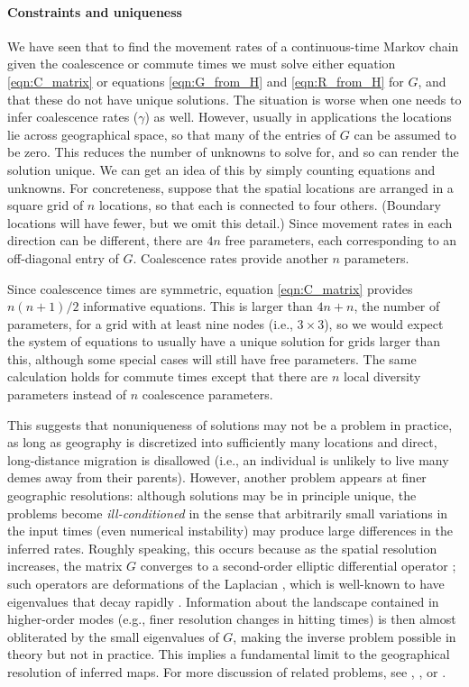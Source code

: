 \documentclass{article}
\begin{document}
\paragraph{Constraints and uniqueness}
We have seen that to find the movement rates of a continuous-time Markov chain
given the coalescence or commute times
we must solve either equation \eqref{eqn:C_matrix} 
or equations \eqref{eqn:G_from_H} and \eqref{eqn:R_from_H} for $G$,
and that these do not have unique solutions.
The situation is worse when one needs to infer coalescence rates ($\gamma$) as well.
However, usually in applications the locations lie across geographical space,
so that many of the entries of $G$ can be assumed to be zero.
This reduces the number of unknowns to solve for,
and so can render the solution unique.
We can get an idea of this by simply counting equations and unknowns.
For concreteness, suppose that the spatial locations
are arranged in a square grid of $n$ locations,
so that each is connected to four others.
(Boundary locations will have fewer, but we omit this detail.)
Since movement rates in each direction can be different,
there are $4n$ free parameters, each corresponding to an off-diagonal entry of $G$.
Coalescence rates provide another $n$ parameters.

Since coalescence times are symmetric, 
equation \eqref{eqn:C_matrix} provides $n (n+1)/2$ informative equations.
This is larger than $4n+n$, the number of parameters,
for a grid with at least nine nodes (i.e., $3 \times 3$),
so we would expect the system of equations to usually have a unique solution
for grids larger than this,
although some special cases will still have free parameters. 
The same calculation holds for commute times 
except that there are $n$ local diversity parameters instead of $n$ coalescence parameters.

This suggests that nonuniqueness of solutions may not be a problem in practice,
as long as geography is discretized into sufficiently many locations
and direct, long-distance migration is disallowed 
(i.e., an individual is unlikely to live many demes away from their parents).
However, another problem appears at finer geographic resolutions:
although solutions may be in principle unique,
the problems become \emph{ill-conditioned} 
in the sense that arbitrarily small variations in the input times
(even numerical instability)
may produce large differences in the inferred rates.
Roughly speaking, this occurs because as the spatial resolution increases,
the matrix $G$ converges to a second-order elliptic differential operator \citep{stroock1997multidimensional};
such operators are deformations of the Laplacian \citep{feller4},
which is well-known to have eigenvalues that decay rapidly 
\citep{hpmckean1967curvature,kuttler1984eigenvalues}.
Information about the landscape contained in higher-order modes
(e.g., finer resolution changes in hitting times)
is then almost obliterated by the small eigenvalues of $G$,
making the inverse problem possible in theory but not in practice.
This implies a fundamental limit to the geographical resolution of inferred maps.
For more discussion of related problems, see 
\citet{epstein2008badtruth}, \citet{myers2008learn}, or \citet{terhorst2015fundamental}.
\end{document}
